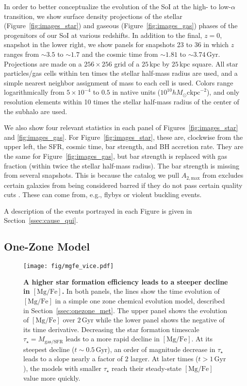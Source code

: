 \documentclass[linenumbers, twocolumn]{aastex631}
\newcommand{\Gyr}{\ensuremath{\textrm{Gyr}}}
\newcommand{\kpc}{\ensuremath{\textrm{kpc}}}
\newcommand{\ckpc}{\ensuremath{\textrm{ckpc}}}
\newcommand{\MgFe}{\ensuremath{[\textrm{Mg}/\textrm{Fe}]}}
\newcommand{\Atmax}{\ensuremath{A_{2,\textrm{max}}}}
\begin{document}
In order to better conceptualize the evolution of the SoI at the high- to low-$\alpha$ transition, we show surface density projections of the stellar (Figure~\ref{fig:images_star}) and gaseous (Figure~\ref{fig:images_gas}) phases of the progenitors of our SoI at various redshifts. In addition to the final, $z=0$, snapshot in the lower right, we show panels for snapshots 23 to 36 in which $z$ ranges from $\sim3.5$ to $\sim1.7$ and the cosmic time from $\sim1.81$ to $\sim3.74\,\Gyr$. Projections are made on a $256\times256$ grid of a $25\,\kpc$ by $25\,\kpc$ square. All star particles/gas cells within ten times the stellar half-mass radius are used, and a simple nearest neighbor assignment of mass to each cell is used. Colors range logarithmically from $5\times10^{-4}$ to $0.5$ in native units ($10^{10} h M_{\odot} \ckpc^{-2}$), and only resolution elements within 10 times the stellar half-mass radius of the center of the subhalo are used.

We also show four relevant statistics in each panel of Figures~\ref{fig:images_star} and \ref{fig:images_gas}. For Figure~\ref{fig:images_star}, these are, clockwise from the upper left, the SFR, cosmic time, bar strength, and BH accretion rate. They are the same for Figure~\ref{fig:images_gas}, but bar strength is replaced with gas fraction (within twice the stellar half-mass radius). The bar strength is missing from several snapshots. This is because the catalog we pull \Atmax{} from excludes certain galaxies from being considered barred if they do not pass certain quality cuts \citep{2022MNRAS.515.1524Z}. These can come from, e.g., flybys or violent buckling events.

A description of the events portrayed in each Figure is given in Section~\ref{ssec:cause_qui}.

\subsection{One-Zone Model}\label{ssec:onezone}

\begin{figure}
  \centering
  \texttt{[image: fig/mgfe\_vice.pdf]}
  \caption{\textbf{A higher star formation efficiency leads to a steeper decline in \MgFe{}.} In both panels, the lines show the time evolution of \MgFe{} in a simple one zone chemical evolution model, described in Section~\ref{ssec:onezone_met}. The upper panel shows the evolution of \MgFe{} over $2\,\Gyr$ while the lower panel shows the negative of its time derivative. Decreasing the star formation timescale $\tau_{\star}=M_{\textrm{gas}/\textrm{SFR}}$ leads to a more rapid decline in \MgFe{}. At its steepest decline ($t\sim0.5\,\Gyr$), an order of magnitude decrease in $\tau_{\star}$ leads to a slope nearly a factor of $2$ larger. At later times ($t>1\,\Gyr$), the models with smaller $\tau_{\star}$ reach their steady-state \MgFe{} value more quickly.}
  \label{fig:vice}
\end{figure}
\end{document}
